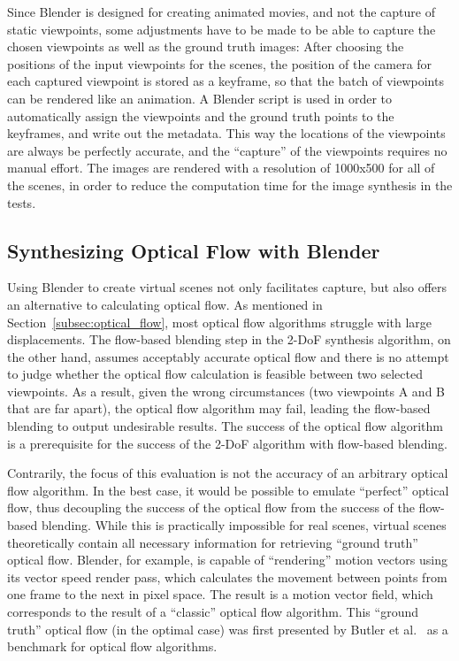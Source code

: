 Since Blender is designed for creating animated movies, and not the capture of static viewpoints, some adjustments have to be made to be able to capture the chosen viewpoints as well as the ground truth images: After choosing the positions of the input viewpoints for the scenes, the position of the camera for each captured viewpoint is stored as a keyframe, so that the batch of viewpoints can be rendered like an animation. A Blender script is used in order to automatically assign the viewpoints and the ground truth points to the keyframes, and write out the metadata. This way the locations of the viewpoints are always be perfectly accurate, and the ``capture'' of the viewpoints requires no manual effort. The images are rendered with a resolution of 1000x500 for all of the scenes, in order to reduce the computation time for the image synthesis in the tests.




\newpage
\subsection{Synthesizing Optical Flow with Blender} \label{subsec:gt_of}
Using Blender to create virtual scenes not only facilitates capture, but also offers an alternative to calculating optical flow. As mentioned in Section~\ref{subsec:optical_flow}, most optical flow algorithms struggle with large displacements.
The flow-based blending step in the 2-DoF synthesis algorithm, on the other hand, assumes acceptably accurate optical flow and there is no attempt to judge whether the optical flow calculation is feasible between two selected viewpoints.
As a result, given the wrong circumstances (two viewpoints A and B that are far apart), the optical flow algorithm may fail, leading the flow-based blending to output undesirable results. The success of the optical flow algorithm is a prerequisite for the success of the 2-DoF algorithm with flow-based blending.

Contrarily, the focus of this evaluation is not the accuracy of an arbitrary optical flow algorithm. In the best case, it would be possible to emulate ``perfect'' optical flow, thus decoupling the success of the optical flow from the success of the flow-based blending. While this is practically impossible for real scenes, virtual scenes theoretically contain all necessary information for retrieving ``ground truth'' optical flow. Blender, for example, is capable of ``rendering'' motion vectors using its vector speed render pass, which calculates the movement between points from one frame to the next in pixel space. The result is a motion vector field, which corresponds to the result of a ``classic'' optical flow algorithm. This ``ground truth'' optical flow (in the optimal case) was first presented by Butler et al.\ \cite{sintel} as a benchmark for optical flow algorithms.

